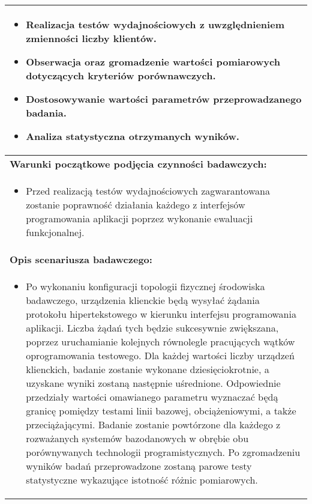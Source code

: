 \begin{longtable}[c]{|llll|}
    \multicolumn{4}{|p{\linewidth}|}{
        \begin{itemize}
            \item Realizacja testów wydajnościowych z uwzględnieniem zmienności liczby klientów.
            \item Obserwacja oraz gromadzenie wartości pomiarowych dotyczących kryteriów porównawczych.
            \item Dostosowywanie wartości parametrów przeprowadzanego badania.
            \item Analiza statystyczna otrzymanych wyników.
        \end{itemize}
    }                                                           \\ \hline
    \multicolumn{4}{|l|}{\textbf{Warunki początkowe podjęcia czynności badawczych:}} \\ \hline
    \multicolumn{4}{|p{\linewidth}|}{
        \begin{itemize}[label={}]
            \item Przed realizacją testów wydajnościowych zagwarantowana zostanie poprawność działania każdego z interfejsów programowania aplikacji poprzez wykonanie ewaluacji funkcjonalnej.
          \end{itemize}
    }                                                           \\ \hline
    \multicolumn{4}{|l|}{\textbf{Opis scenariusza badawczego:}}                      \\ \hline
    \multicolumn{4}{|p{\linewidth}|}{
        \begin{itemize}[label={}]
            \item Po wykonaniu konfiguracji topologii fizycznej środowiska badawczego, urządzenia klienckie będą wysyłać żądania protokołu hipertekstowego w kierunku interfejsu programowania aplikacji. Liczba żądań tych będzie sukcesywnie zwiększana, poprzez uruchamianie kolejnych równolegle pracujących wątków oprogramowania testowego. Dla każdej wartości liczby urządzeń klienckich, badanie zostanie wykonane dziesięciokrotnie, a uzyskane wyniki zostaną następnie uśrednione. Odpowiednie przedziały wartości omawianego parametru wyznaczać będą granicę pomiędzy testami linii bazowej, obciążeniowymi, a także przeciążającymi. Badanie zostanie powtórzone dla każdego z rozważanych systemów bazodanowych w obrębie obu porównywanych technologii programistycznych. Po zgromadzeniu wyników badań przeprowadzone zostaną parowe testy statystyczne wykazujące istotność różnic pomiarowych.

\end{itemize}}
\end{longtable}
